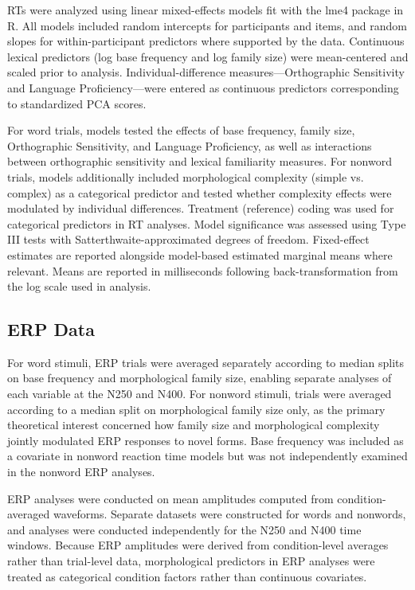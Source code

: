 \documentclass[utf8]{FrontiersinHarvard} %
\begin{document}
RTs were analyzed using linear mixed-effects models fit with the lme4 package in R. All models included random intercepts for participants and items, and random slopes for within-participant predictors where supported by the data. Continuous lexical predictors (log base frequency and log family size) were mean-centered and scaled prior to analysis. Individual-difference measures—Orthographic Sensitivity and Language Proficiency—were entered as continuous predictors corresponding to standardized PCA scores.

For word trials, models tested the effects of base frequency, family size, Orthographic Sensitivity, and Language Proficiency, as well as interactions between orthographic sensitivity and lexical familiarity measures. For nonword trials, models additionally included morphological complexity (simple vs. complex) as a categorical predictor and tested whether complexity effects were modulated by individual differences. Treatment (reference) coding was used for categorical predictors in RT analyses. Model significance was assessed using Type III tests with Satterthwaite-approximated degrees of freedom. Fixed-effect estimates are reported alongside model-based estimated marginal means where relevant. Means are reported in milliseconds following back-transformation from the log scale used in analysis.

\subsection{ERP Data}
For word stimuli, ERP trials were averaged separately according to median splits on base frequency and morphological family size, enabling separate analyses of each variable at the N250 and N400. For nonword stimuli, trials were averaged according to a median split on morphological family size only, as the primary theoretical interest concerned how family size and morphological complexity jointly modulated ERP responses to novel forms. Base frequency was included as a covariate in nonword reaction time models but was not independently examined in the nonword ERP analyses. 

ERP analyses were conducted on mean amplitudes computed from condition-averaged waveforms. Separate datasets were constructed for words and nonwords, and analyses were conducted independently for the N250 and N400 time windows. Because ERP amplitudes were derived from condition-level averages rather than trial-level data, morphological predictors in ERP analyses were treated as categorical condition factors rather than continuous covariates.
\end{document}
